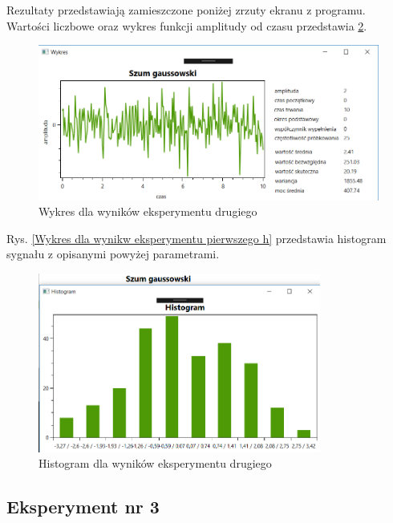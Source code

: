 \documentclass[12pt]{article}
\begin{document}
Rezultaty przedstawiają zamieszczone poniżej zrzuty ekranu z programu. Wartości liczbowe oraz wykres funkcji amplitudy od czasu przedstawia \ref{Histogram dla wyników eksperymentu drugiego}.
\begin{figure}[h!]
 \centering
 \includegraphics[width=12.3cm]{szumGauss.PNG}
 \vspace{-0.3cm}
 \caption{Wykres dla wyników eksperymentu drugiego}
 \label{Wykres dla wyników eksperymentu drugiego}
\end{figure}
\newpage
Rys. \ref{Wykres dla wynikw eksperymentu pierwszego h} przedstawia histogram sygnału z opisanymi powyżej parametrami. 
\begin{figure}[h!]
 \centering
 \includegraphics[width=9.3cm]{szumGaussHist.PNG}
 \vspace{-0.3cm}
 \caption{Histogram dla wyników eksperymentu drugiego}
 \label{Histogram dla wyników eksperymentu drugiego}
\end{figure}


\subsection{Eksperyment nr 3}
\end{document}
